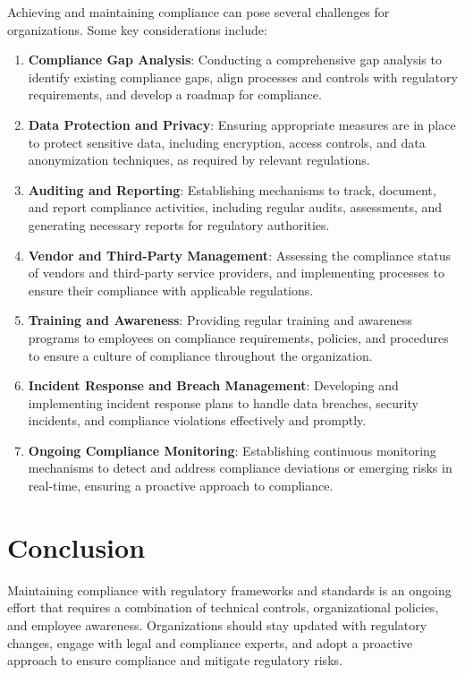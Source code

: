 Achieving and maintaining compliance can pose several challenges for organizations. Some key considerations include:
    \begin{enumerate}

        \item \textbf{Compliance Gap Analysis}: Conducting a comprehensive gap analysis to identify existing compliance gaps, align processes and controls with regulatory requirements, and develop a roadmap for compliance.

        \item \textbf{Data Protection and Privacy}: Ensuring appropriate measures are in place to protect sensitive data, including encryption, access controls, and data anonymization techniques, as required by relevant regulations.

        \item \textbf{Auditing and Reporting}: Establishing mechanisms to track, document, and report compliance activities, including regular audits, assessments, and generating necessary reports for regulatory authorities.

        \item \textbf{Vendor and Third-Party Management}: Assessing the compliance status of vendors and third-party service providers, and implementing processes to ensure their compliance with applicable regulations.

        \item \textbf{Training and Awareness}: Providing regular training and awareness programs to employees on compliance requirements, policies, and procedures to ensure a culture of compliance throughout the organization.

        \item \textbf{Incident Response and Breach Management}: Developing and implementing incident response plans to handle data breaches, security incidents, and compliance violations effectively and promptly.

        \item \textbf{Ongoing Compliance Monitoring}: Establishing continuous monitoring mechanisms to detect and address compliance deviations or emerging risks in real-time, ensuring a proactive approach to compliance.
    \end{enumerate}

\section*{Conclusion}

Maintaining compliance with regulatory frameworks and standards is an ongoing effort that requires a combination of technical controls, organizational policies, and employee awareness. Organizations should stay updated with regulatory changes, engage with legal and compliance experts, and adopt a proactive approach to ensure compliance and mitigate regulatory risks.